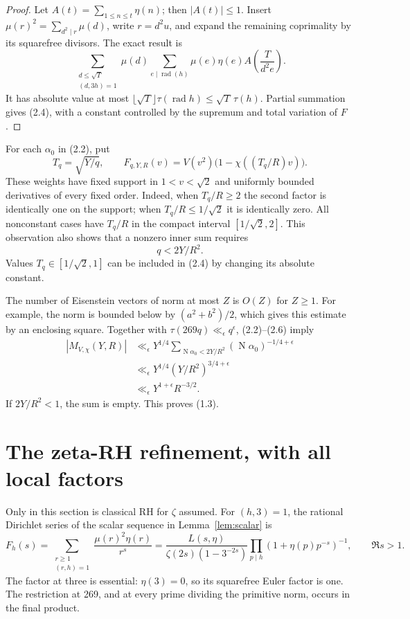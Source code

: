 \documentclass[11pt]{article}
\newcommand{\N}{\operatorname N}
\begin{document}
\begin{proof}
Let $A(t)=\sum_{1\le n\le t}\eta(n)$; then $|A(t)|\le1$.
Insert $\mu(r)^2=\sum_{d^2\mid r}\mu(d)$, write $r=d^2u$,
and expand the remaining coprimality by its squarefree divisors.
The exact result is
\[
 \sum_{\substack{d\le\sqrt T\\(d,3h)=1}}\mu(d)
     \sum_{e\mid\operatorname{rad}(h)}
          \mu(e)\eta(e) A\left(\frac{T}{d^2e}\right).
\]
It has absolute value at most $\lfloor\sqrt T\rfloor
\tau(\operatorname{rad}h)\le\sqrt T\,\tau(h)$.
Partial summation gives (2.4), with a constant controlled by
the supremum and total variation of $F$.
\end{proof}

For each $\alpha_0$ in (2.2), put
\[
 T_q=\sqrt{Y/q},\qquad
 F_{q,Y,R}(v)=V(v^2)\bigl(1-\chi((T_q/R)v)\bigr).
                                                        \tag{2.5}
\]
These weights have fixed support in $1<v<\sqrt2$ and uniformly
bounded derivatives of every fixed order.
Indeed, when $T_q/R\ge2$ the second factor is identically one
on the support; when $T_q/R\le1/\sqrt2$ it is identically zero.
All nonconstant cases have $T_q/R$ in the compact interval
$[1/\sqrt2,2]$. This observation also shows that a nonzero
inner sum requires
\[
                       q<2Y/R^2.                       \tag{2.6}
\]
Values $T_q\in[1/\sqrt2,1]$ can be included in (2.4) by changing
its absolute constant.

The number of Eisenstein vectors of norm at most $Z$ is $O(Z)$
for $Z\ge1$. For example, the norm is bounded below by
$(a^2+b^2)/2$, which gives this estimate by an enclosing square.
Together with $\tau(269q)\ll_\epsilon q^\epsilon$,
(2.2)--(2.6) imply
\begin{align*}
 |M_{V,\chi}(Y,R)|
 &\ll_\epsilon
       Y^{1/4}\sum_{\N\alpha_0<2Y/R^2}
                    (\N\alpha_0)^{-1/4+\epsilon}\\
 &\ll_\epsilon
       Y^{1/4}(Y/R^2)^{3/4+\epsilon}\\
 &\ll_\epsilon Y^{1+\epsilon}R^{-3/2}.
\end{align*}
If $2Y/R^2<1$, the sum is empty. This proves (1.3).

\section{The zeta-RH refinement, with all local factors}

Only in this section is classical RH for $\zeta$ assumed.
For $(h,3)=1$, the rational Dirichlet series of the scalar
sequence in Lemma~\ref{lem:scalar} is
\[
 F_h(s)=\sum_{\substack{r\ge1\\(r,h)=1}}
             \frac{\mu(r)^2\eta(r)}{r^s}
 =\frac{L(s,\eta)}
        {\zeta(2s)(1-3^{-2s})}
      \prod_{p\mid h}(1+\eta(p)p^{-s})^{-1},
          \qquad\Re s>1.                               \tag{3.1}
\]
The factor at three is essential: $\eta(3)=0$, so its squarefree
Euler factor is one. The restriction at 269, and at every
prime dividing the primitive norm, occurs in the final product.
\end{document}
